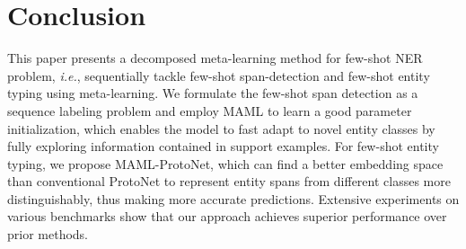 \documentclass[11pt]{article}
\newcommand\ie{\textit{i.e.}}
\begin{document}
\section{Conclusion}
This paper presents a decomposed meta-learning method for few-shot NER problem, \ie,
sequentially tackle few-shot span-detection and few-shot entity typing using meta-learning.
We formulate the few-shot span detection as a sequence labeling problem and employ MAML to learn a good parameter initialization, which enables the model to fast adapt to novel entity classes by fully exploring information contained in support examples.
For few-shot entity typing, we propose MAML-ProtoNet, which can find a better embedding space than conventional ProtoNet to represent entity spans from different classes more distinguishably, thus making more accurate predictions.
Extensive experiments on various benchmarks show that our approach achieves superior performance over prior methods.
\end{document}
